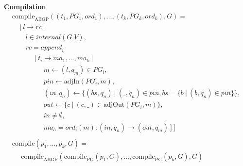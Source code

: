 \documentclass[twocolumn, openany]{sig-alternate-10pt}
\newcommand{\hdr}[2]{\flushleft \chdr{\hspace{5mm}#1}{#2}}
\newcommand{\chdr}[2]{\textbf{#1} {#2} \\ \centering}%
\begin{document}
\begin{figure*}[t!]
\begin{minipage}[t]{.46\linewidth}
  \end{minipage}
  \begin{minipage}[t]{.5\linewidth}
  \hdr{Compilation}{}
  \vspace*{-1\baselineskip}
  \[ \begin{array}{l}
     \text{compile}_\text{ABGP}( (t_1,PG_1,ord_1), \dots, (t_k,PG_k,ord_k), G ) = \\
     ~~~~~ [~ l \rightarrow rc ~\vert~ \\
     ~~~~~~~~~ l \in internal(G.V), \\
     ~~~~~~~~~ rc = \mathit{append}_i~  \\
     ~~~~~~~~~~~~~~~ [~ t_i \rightarrow ma_1, \dots, ma_k ~\vert~ \\
     ~~~~~~~~~~~~~~~~~~~~~ m \leftarrow (l,q_m) \in PG_i, \\
     ~~~~~~~~~~~~~~~~~~~~~ pin \leftarrow \text{adjIn}(PG_i,m), \\
     ~~~~~~~~~~~~~~~~~~~~~ (in,q_n) \leftarrow \{ (bs,q_n) ~\vert~ (\_,q_n) \in pin, bs=\{b ~\vert~ (b,q_n) \in pin \} \}, \\
     ~~~~~~~~~~~~~~~~~~~~~ out \leftarrow \{ c ~\vert~ (c,\_) \in \text{adjOut}(PG_i,m) \}, \\
     ~~~~~~~~~~~~~~~~~~~~~ in \neq \emptyset, \\
     ~~~~~~~~~~~~~~~~~~~~~ ma_h = ord_i(m) : (in,q_n) \rightarrow (out,q_m) ~] ~] \\
     \\
     \text{compile}( p_1, \dots, p_k, G) = \\
     ~~~~~~ \text{compile}_\text{ABGP}(\text{compile}_\text{PG}(p_1,G), \dots, \text{compile}_\text{PG}(p_k,G), G) \\
  \end{array} \]%
  \end{minipage}%

  \vspace{1em}
  \vspace{1em}%


\end{figure*}
\end{document}

